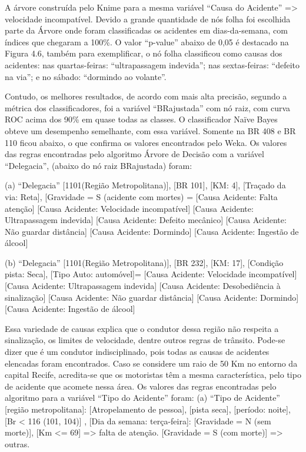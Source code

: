 A árvore construída pelo Knime para a mesma variável “Causa do Acidente” => velocidade incompatível.
Devido a grande quantidade de nós folha foi escolhida parte da Árvore onde foram classificadas os acidentes em dias-da-semana, com índices que chegaram a 100\%. O valor ``p-value'' abaixo de 0,05 é destacado na Figura 4.6, também para exemplificar, o nó folha classificou como causas dos acidentes: nas
quartas-feiras: “ultrapassagem indevida”; nas sextas-feiras:
“defeito na via”; e no sábado: “dormindo ao volante”.

\pagebreak

Contudo, os melhores resultados, de acordo com mais alta
precisão, segundo a métrica dos classificadores, foi a variável
“BRajustada” com nó raiz, com curva ROC acima dos 90\% em quase todas 
as classes. O classificador Naïve Bayes obteve um
desempenho semelhante, com essa
variável. Somente na BR 408 e BR 110 ficou abaixo, o que
confirma os valores encontrados pelo Weka.
Os valores das regras encontradas pelo algoritmo Árvore de Decisão com a variável “Delegacia”, (abaixo do nó raiz BRajustada) foram:

(a) “Delegacia” [1101(Região Metropolitana)], [BR 101],
[KM: 4], [Traçado da via: Reta], [Gravidade = S (acidente com
mortes) = 
[Causa Acidente: Falta atenção]
[Causa Acidente: Velocidade incompatível]
[Causa Acidente: Ultrapassagem indevida]
[Causa Acidente: Defeito mecânico]
[Causa Acidente: Não guardar distância]
[Causa Acidente: Dormindo]
[Causa Acidente: Ingestão de álcool]

(b) “Delegacia” [1101(Região Metropolitana)], [BR 232],
[KM: 17], [Condição pista: Seca], [Tipo Auto: automóvel]=
[Causa Acidente: Velocidade incompatível]
[Causa Acidente: Ultrapassagem indevida]
[Causa Acidente: Desobediência à sinalização]
[Causa Acidente: Não guardar distância]
[Causa Acidente: Dormindo]
[Causa Acidente: Ingestão de álcool]

Essa variedade de causas explica que o condutor dessa
região não respeita a sinalização, os limites de velocidade, dentre outros regras de trânsito. Pode-se dizer que é um condutor
indisciplinado, pois todas as causas de acidentes elencadas foram encontrados.
Caso se considere um raio de 50 Km no entorno da capital Recife, acredita-se que os motoristas têm a mesma
característica, pelo tipo de acidente que acomete nessa área.
Os valores das regras encontradas pelo algoritmo para a
variável “Tipo do Acidente” foram:
(a) “Tipo de Acidente” [região metropolitana]: [Atropelamento
de pessoa], [pista seca], [período: noite], [Br < 116 (101, 104)]
, [Dia da semana: terça-feira]:
[Gravidade = N (sem morte)], [Km <= 69] => falta de atenção.
[Gravidade = S (com morte)] => outras.

